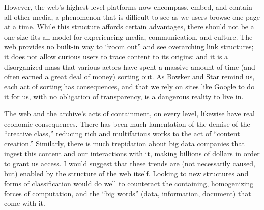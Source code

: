 However, the web’s highest-level platforms now encompass, embed, and contain all other media, a phenomenon that is difficult to see as we users browse one page at a time. While this structure affords certain advantages, there should not be a one-size-fits-all model for experiencing media, communication, and culture. The web provides no built-in way to “zoom out” and see overarching link structures; it does not allow curious users to trace content to its origins; and it is a disorganized mass that various actors have spent a massive amount of time (and often earned a great deal of money) sorting out. As Bowker and Star remind us, each act of sorting has consequences, and that we rely on sites like Google to do it for us, with no obligation of transparency, is a dangerous reality to live in.

The web and the archive’s acts of containment, on every level, likewise have real economic consequences. There has been much lamentation of the demise of the “creative class,” reducing rich and multifarious works to the act of “content creation.” Similarly, there is much trepidation about big data companies that ingest this content and our interactions with it, making billions of dollars in order to grant us access. I would suggest that these trends are (not necessarily caused, but) enabled by the structure of the web itself. Looking to new structures and forms of classification would do well to counteract the containing, homogenizing forces of computation, and the “big words” (data, information, document) that come with it.





